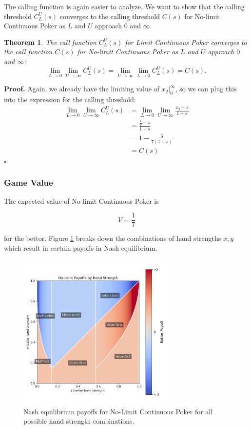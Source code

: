 \documentclass[a4paper,12pt]{article}
\theoremstyle{plain}
\newtheorem{theorem}{Theorem}[section]
\theoremstyle{definition}
\newenvironment{customproof}[1][Proof]{\noindent\textbf{#1.} }{\hfill$\square$\vspace{1em}}
\begin{document}
The calling function is again easier to analyze. We want to show that the calling threshold $C_L^U(s)$ converges to the calling threshold $C(s)$ for No-limit Continuous Poker as $L$ and $U$ approach $0$ and $\infty$.
\begin{theorem}
    The call function $C_L^U(s)$ for Limit Continuous Poker converges to the call function $C(s)$ for No-limit Continuous Poker as $L$ and $U$ approach $0$ and $\infty$:
\[
\lim_{L \to 0} \lim_{U \to \infty} C_L^U(s) = \lim_{U \to \infty} \lim_{L \to 0} C_L^U(s) = C(s).
\]
\end{theorem}
\begin{customproof}
Again, we already have the limiting value of $x_2|_0^\infty$, so we can plug this into the expression for the calling threshold:
\begin{align*}
    \lim_{L \to 0} \lim_{U \to \infty} C_L^U(s) & = \lim_{L \to 0} \lim_{U \to \infty} \frac{x_2+s}{1+s}\\
    & = \frac{\frac{1}{7}+s}{1+s}\\
    & = 1 - \frac{6}{7(1+s)}\\
    & = C(s)
\end{align*}
\end{customproof}

\subsubsection{Game Value}

The expected value of No-limit Continuous Poker is 

$$ V = \frac{1}{7} $$

for the bettor. Figure \ref{fig:no-limit-payoff} breaks down the combinations of hand strengths $x, y$ which result in certain payoffs in Nash equilibrium.

\begin{figure}[h!]
    \centering
    \includegraphics[width=0.7\textwidth]{payoff_heatmap_with_regions_labeled.png}
    \caption{Nash equilibrium payoffs for No-Limit Continuous Poker for all possible hand strength combinations.}
    \label{fig:no-limit-payoff}
\end{figure}
\end{document}
